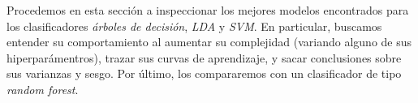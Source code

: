 



Procedemos en esta sección a inspeccionar los mejores modelos encontrados para los clasificadores \textit{árboles de decisión}, \textit{LDA} y \textit{SVM}. En particular, buscamos entender su comportamiento al aumentar su complejidad (variando alguno de sus hiperparámentros), trazar sus curvas de aprendizaje, y sacar conclusiones sobre sus varianzas y sesgo. Por último, los compararemos con un clasificador de tipo \textit{random forest}.

